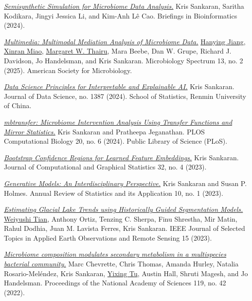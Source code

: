 \documentclass[letterpaper]{article}
\renewenvironment{itemize}{
  \begin{list}{}{
    \setlength{\leftmargin}{1.5em}
  }
}{
  \end{list}
}
\begin{document}
\begin{itemize}
  \item \href{https://doi.org/10.1093/bib/bbaf051}{\textit{Semisynthetic Simulation for Microbiome Data Analysis.}} Kris Sankaran, Saritha Kodikara, Jingyi Jessica Li, and Kim-Anh Lê Cao. Briefings in Bioinformatics (2024).  
  \item \href{https://doi.org/10.1128/spectrum.01131-24}{\textit{Multimedia: Multimodal Mediation Analysis of Microbiome Data.}} \underline{Hanying Jiang}, \underline{Xinran Miao}, \underline{Margaret W. Thairu}, Mara Beebe, Dan W. Grupe, Richard J. Davidson, Jo Handelsman, and Kris Sankaran. Microbiology Spectrum 13, no. 2 (2025). American Society for Microbiology. 
  \item \href{https://doi.org/10.6339/24-jds1150}{\textit{Data Science Principles for Interpretable and Explainable AI.}} Kris Sankaran. Journal of Data Science, no. 1387 (2024). School of Statistics, Renmin University of China.
  \item \href{https://doi.org/10.1371/journal.pcbi.1012196}{\textit{mbtransfer: Microbiome Intervention Analysis Using Transfer Functions and Mirror Statistics.}} Kris Sankaran and Pratheepa Jeganathan. PLOS Computational Biology 20, no. 6 (2024). Public Library of Science (PLoS).  
  \item \href{https://doi.org/10.1080/10618600.2023.2197478}{\textit{Bootstrap Confidence Regions for Learned Feature Embeddings.}} Kris Sankaran. Journal of Computational and Graphical Statistics 32, no. 4 (2023).  
  \item \href{https://doi.org/10.1146/annurev-statistics-033121-110134}{\textit{Generative Models: An Interdisciplinary Perspective.}} Kris Sankaran and Susan P. Holmes. Annual Review of Statistics and its Application 10, no. 1 (2023).  
  \item \href{https://doi.org/10.1109/JSTARS.2022.3215722}{\textit{Estimating Glacial Lake Trends using Historically Guided Segmentation Models.}} \underline{Weiyushi Tian}, Anthony Ortiz, Tenzing C. Sherpa, Finu Shrestha, Mir Matin, Rahul Dodhia, Juan M. Lavista Ferres, Kris Sankaran. IEEE Journal of Selected Topics in Applied Earth Observations and Remote Sensing 15 (2023).  
  \item \href{https://doi.org/10.1073/pnas.2212930119}{\textit{Microbiome composition modulates secondary metabolism in a multispecies bacterial community.}} Marc Chevrette, Chris Thomas, Amanda Hurley, Natalia Rosario-Meléndez, Kris Sankaran, \underline{Yixing Tu}, Austin Hall, Shruti Magesh, and Jo Handelsman. Proceedings of the National Academy of Sciences 119, no. 42 (2022).  

\end{itemize}
\end{document}
